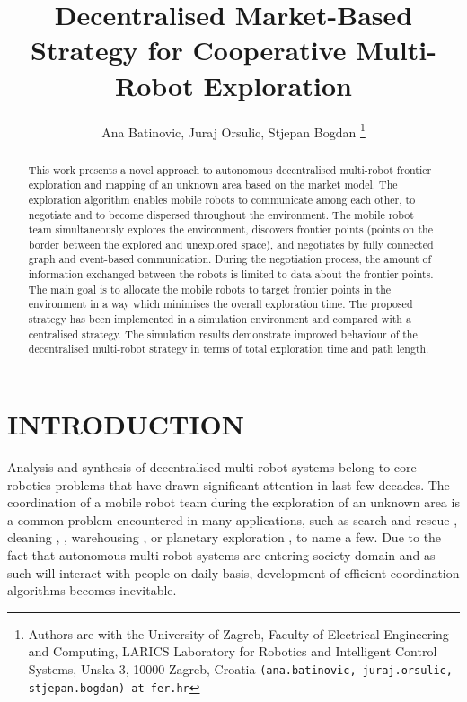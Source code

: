\documentclass[letterpaper, 10 pt, conference]{ieeeconf}  %
\title{\LARGE \bf
Decentralised Market-Based Strategy for Cooperative Multi-Robot Exploration 
}
\author{Ana Batinovic, Juraj Orsulic, Stjepan Bogdan
	\thanks{Authors are with the University of Zagreb, Faculty of Electrical Engineering  and Computing, LARICS Laboratory for Robotics and Intelligent Control Systems, Unska 3, 10000 Zagreb, Croatia
        {\tt\small (ana.batinovic, juraj.orsulic, stjepan.bogdan) at fer.hr}}}%
\begin{document}
\maketitle
\thispagestyle{empty}
\pagestyle{empty}


\begin{abstract}

This work presents a novel approach to autonomous decentralised multi-robot frontier exploration and mapping of an unknown area based on the market model. The exploration algorithm enables mobile robots to communicate among each other, to negotiate and to become dispersed throughout the environment. The mobile robot team simultaneously explores the environment, discovers frontier points (points on the border between the explored and unexplored space), and negotiates by fully connected graph and event-based communication. During the negotiation process, the amount of information exchanged between the robots is limited to data about the frontier points. The main goal is to allocate the mobile robots to target frontier points in the environment in a way which minimises the overall exploration time. The proposed strategy has been implemented in a simulation environment and compared with a centralised strategy. The simulation results demonstrate improved behaviour of the decentralised multi-robot strategy in terms of total exploration time and path length. 

\end{abstract}

 
\section{INTRODUCTION}
Analysis and synthesis of decentralised multi-robot systems belong to core robotics problems that have drawn significant attention in last few decades. The coordination of a mobile robot team during the exploration of an unknown area is a common problem encountered in many applications, such as search and rescue \cite{rescue}, cleaning \cite{cleaning1}, \cite{cleaning2}, warehousing \cite{Wurman}, or planetary exploration \cite{planetary}, to name a few. Due to the fact that autonomous multi-robot systems are entering society domain and as such will interact with people on daily basis, development of efficient coordination algorithms becomes inevitable.
\end{document}
